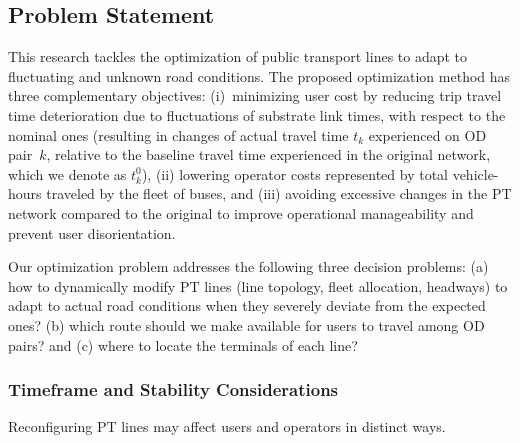 \documentclass[a4paper,fleqn]{cas-sc}
\begin{document}
\subsection{Problem Statement}\label{sec:problemStatement}
This research tackles the optimization of public transport lines  to adapt to fluctuating and unknown road conditions.
%
The proposed optimization method has three complementary objectives: 
(i)~minimizing user cost by reducing trip travel time deterioration due to fluctuations of substrate link times, with respect to the nominal ones (resulting in changes of actual travel time $t_k$ experienced on OD pair~$k$, relative to the baseline travel time experienced in the original network, which we denote as $t_k^0$), 
(ii) lowering operator costs represented by total vehicle-hours traveled by the fleet of buses, and (iii) avoiding excessive changes in the PT network compared to the original to improve operational manageability and prevent user disorientation.

Our optimization problem addresses the following three decision problems:
(a) how to dynamically modify PT lines (line topology, fleet allocation, headways) to adapt to actual road conditions when they severely deviate from the expected ones?
(b) which route should we make available for users to travel among OD pairs? and
(c) where to locate the terminals of each line?


\subsubsection{Timeframe and Stability Considerations}\label{sec:timeframe}
Reconfiguring PT lines may affect users and operators in distinct ways. 
\end{document}
